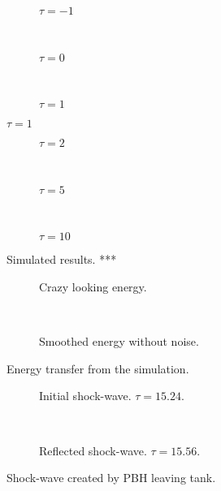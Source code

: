 \documentclass[12pt]{report}
\begin{document}
\begin{figure}[p]
\centering
\begin{subfigure}{\textwidth}

\caption{$\tau = -1$}
\end{subfigure} \\
\begin{subfigure}{\textwidth}

\caption{$\tau = 0$}
\end{subfigure} \\
\begin{subfigure}{\textwidth}

\caption{$\tau = 1$}
\end{subfigure}
\end{figure}
\begin{figure}[p] \ContinuedFloat
\centering
\begin{subfigure}{\textwidth}

\caption{$\tau = 2$}
\end{subfigure} \\
\begin{subfigure}{\textwidth}

\caption{$\tau = 5$}
\end{subfigure} \\
\begin{subfigure}{\textwidth}

\caption{$\tau = 10$}
\end{subfigure}
\caption{Simulated results.  ***}
\end{figure}

\begin{figure}
\centering
\begin{subfigure}{\textwidth}

\caption{Crazy looking energy.}
\end{subfigure} \\
\begin{subfigure}{\textwidth}

\caption{Smoothed energy without noise.}
\end{subfigure}
\caption{Energy transfer from the simulation.}
\end{figure}

\begin{figure}
\centering
\begin{subfigure}{\textwidth}

\caption{Initial shock-wave. $\tau  = 15.24$.}
\end{subfigure} \\
\begin{subfigure}{\textwidth}

\caption{Reflected shock-wave. $\tau = 15.56$.}
\end{subfigure}
\caption{Shock-wave created by PBH leaving tank.}
\end{figure}
\end{document}
